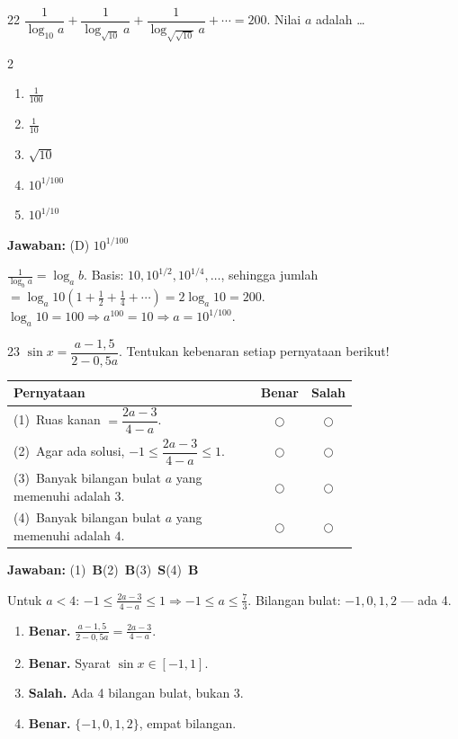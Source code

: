 \documentclass[11pt]{article}
\newcommand{\jawaban}[1]{%
  \noindent\colorbox{gold!30}{\parbox{\dimexpr\linewidth-2\fboxsep\relax}{%
    \textbf{Jawaban:} #1}}\par\smallskip}
\newenvironment{pilB}{%
  \par\smallskip\begin{multicols}{2}
  \begin{enumerate}[label=(\Alph*),leftmargin=*,itemsep=1pt,topsep=3pt]}%
  {\end{enumerate}\end{multicols}}
\begin{document}
\begin{soal}{22}
$\dfrac{1}{\log_{10}a}+\dfrac{1}{\log_{\sqrt{10}}a}+\dfrac{1}{\log_{\sqrt{\sqrt{10}}}a}+\cdots=200$.
Nilai $a$ adalah \ldots
\begin{pilB}
  \item $\tfrac{1}{100}$\item $\tfrac{1}{10}$\item $\sqrt{10}$
  \item $10^{1/100}$\item $10^{1/10}$
\end{pilB}
\end{soal}
\begin{pembox}
\jawaban{(D) $10^{1/100}$}
$\tfrac{1}{\log_b a}=\log_a b$. Basis: $10,10^{1/2},10^{1/4},\ldots$, sehingga
jumlah $=\log_a 10\!\left(1+\tfrac12+\tfrac14+\cdots\right)=2\log_a 10=200$.
$\log_a 10=100\Rightarrow a^{100}=10\Rightarrow a=10^{1/100}$.
\end{pembox}

\begin{soal}{23}
$\sin x=\dfrac{a-1{,}5}{2-0{,}5a}$.
Tentukan kebenaran setiap pernyataan berikut!

\par\smallskip
{\renewcommand{\arraystretch}{1.4}%
\begin{tabular}{@{}p{0.76\linewidth}cc@{}}
\hline\textbf{Pernyataan}&\textbf{Benar}&\textbf{Salah}\\\hline
(1)~Ruas kanan $=\dfrac{2a-3}{4-a}$.&$\bigcirc$&$\bigcirc$\\
(2)~Agar ada solusi, $-1\leq\dfrac{2a-3}{4-a}\leq1$.&$\bigcirc$&$\bigcirc$\\
(3)~Banyak bilangan bulat $a$ yang memenuhi adalah $3$.&$\bigcirc$&$\bigcirc$\\
(4)~Banyak bilangan bulat $a$ yang memenuhi adalah $4$.&$\bigcirc$&$\bigcirc$\\\hline
\end{tabular}}
\end{soal}
\begin{pembox}
\jawaban{(1)~\textbf{B}\quad(2)~\textbf{B}\quad(3)~\textbf{S}\quad(4)~\textbf{B}}
Untuk $a<4$: $-1\leq\tfrac{2a-3}{4-a}\leq1\Rightarrow-1\leq a\leq\tfrac73$.
Bilangan bulat: $-1,0,1,2$ --- ada 4.
\begin{enumerate}[leftmargin=*,topsep=2pt,itemsep=2pt]
\item \textbf{Benar.} $\tfrac{a-1{,}5}{2-0{,}5a}=\tfrac{2a-3}{4-a}$.
\item \textbf{Benar.} Syarat $\sin x\in[-1,1]$.
\item \textbf{Salah.} Ada 4 bilangan bulat, bukan 3.
\item \textbf{Benar.} $\{-1,0,1,2\}$, empat bilangan.
\end{enumerate}
\end{pembox}
\end{document}

